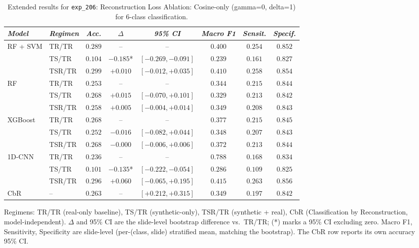 \begin{table}[htp]
\centering
\scriptsize
\caption{Extended results for \texttt{exp\_206}: Reconstruction Loss Ablation: Cosine-only (gamma=0, delta=1) for 6-class classification.}
\label{tab:appendix_exp_206}
\begin{tabular*}{\textwidth}{@{\extracolsep{\fill}}llcccccc}
\toprule
\emph{Model} & \emph{Regimen} & \emph{Acc.} & \emph{$\Delta$} & \emph{95\% CI} & \emph{Macro F1} & \emph{Sensit.} & \emph{Specif.}\\
\midrule
\multirow{3}{*}{RF + SVM} & TR/TR & $0.289$ & -- & -- & $0.400$ & $0.254$ & $0.852$\\
 & TS/TR & $0.104$ & $-0.185$* & $[-0.269, -0.091]$ & $0.239$ & $0.161$ & $0.827$\\
 & TSR/TR & $0.299$ & $+0.010$ & $[-0.012, +0.035]$ & $0.410$ & $0.258$ & $0.854$\\
\midrule
\multirow{3}{*}{RF} & TR/TR & $0.253$ & -- & -- & $0.344$ & $0.215$ & $0.844$\\
 & TS/TR & $0.268$ & $+0.015$ & $[-0.070, +0.101]$ & $0.329$ & $0.213$ & $0.842$\\
 & TSR/TR & $0.258$ & $+0.005$ & $[-0.004, +0.014]$ & $0.349$ & $0.208$ & $0.843$\\
\midrule
\multirow{3}{*}{XGBoost} & TR/TR & $0.268$ & -- & -- & $0.377$ & $0.215$ & $0.845$\\
 & TS/TR & $0.252$ & $-0.016$ & $[-0.082, +0.044]$ & $0.348$ & $0.207$ & $0.843$\\
 & TSR/TR & $0.268$ & $-0.000$ & $[-0.006, +0.006]$ & $0.372$ & $0.213$ & $0.844$\\
\midrule
\multirow{3}{*}{1D-CNN} & TR/TR & $0.236$ & -- & -- & $0.788$ & $0.168$ & $0.834$\\
 & TS/TR & $0.101$ & $-0.135$* & $[-0.222, -0.054]$ & $0.286$ & $0.109$ & $0.825$\\
 & TSR/TR & $0.296$ & $+0.060$ & $[-0.065, +0.195]$ & $0.415$ & $0.263$ & $0.856$\\
\midrule
CbR & -- & $0.263$ & -- & $[+0.212, +0.315]$ & $0.349$ & $0.197$ & $0.842$\\
\bottomrule
\end{tabular*}
\small{Regimens: TR/TR (real-only baseline), TS/TR (synthetic-only), TSR/TR (synthetic + real), CbR (Classification by Reconstruction, model-independent). $\Delta$ and 95\% CI are the slide-level bootstrap difference vs.\ TR/TR; (*) marks a 95\% CI excluding zero. Macro F1, Sensitivity, Specificity are slide-level (per-(class, slide) stratified mean, matching the bootstrap). The CbR row reports its own accuracy 95\% CI.}
\end{table}

